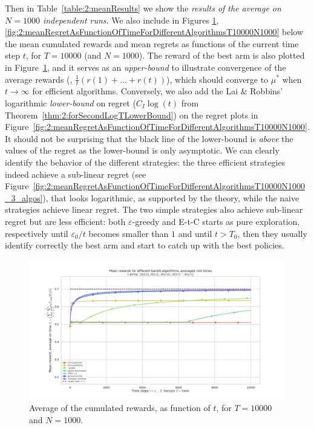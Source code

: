 Then in Table~\ref{table:2:meanResults} we show the \emph{results of the average on $N=1000$ independent runs}.
%
%
We also include in Figures
\ref{fig:2:meanRewardsAsFunctionOfTimeForDifferentAlgorithmsT10000N1000}, \ref{fig:2:meanRegretAsFunctionOfTimeForDifferentAlgorithmsT10000N1000} below the mean cumulated rewards and mean regrets as functions of the current time step $t$, for $T=10000$ (and $N=1000$).
The reward of the best arm is also plotted in Figure~\ref{fig:2:meanRewardsAsFunctionOfTimeForDifferentAlgorithmsT10000N1000}, and it serves as an \emph{upper-bound} to illustrate convergence
of the average rewards
(\ie, $\frac{1}{t} (r(1) + \dots + r(t))$),
which should converge to $\mu^*$ when $t\to\infty$ for efficient algorithms.
Conversely, we also add the Lai \& Robbins' logarithmic \emph{lower-bound} on regret ($C_I \log(t)$ from Theorem~\ref{thm:2:forSecondLogTLowerBound}) on the regret plots in Figure~\ref{fig:2:meanRegretAsFunctionOfTimeForDifferentAlgorithmsT10000N1000}.
It should not be surprising that the black line of the lower-bound is \emph{above} the values of the regret as the lower-bound is only asymptotic.
%
We can clearly identify the behavior of the different strategies:
the three efficient strategies indeed achieve a sub-linear regret (see Figure~\ref{fig:2:meanRegretAsFunctionOfTimeForDifferentAlgorithmsT10000N1000_3_algos}), that looks logarithmic, as supported by the theory,
while the naive strategies achieve linear regret.
The two simple strategies also achieve sub-linear regret but are less efficient:
both $\varepsilon$-greedy and E-t-C starts as pure exploration, respectively until $\varepsilon_0/t$ becomes smaller than $1$ and until $t > T_0$, then they usually identify correctly the best arm and start to catch up with the best policies.



\begin{figure}[h!]  %
    \includegraphics[width=1.10\linewidth]{SP__K5_T10000_N1000__7_algos/main_MeanRewards____env1-1_3198350886837790844.pdf}
	\caption{Average of the cumulated rewards, as function of $t$, for $T=10000$ and $N=1000$.}
	\label{fig:2:meanRewardsAsFunctionOfTimeForDifferentAlgorithmsT10000N1000}
\end{figure}


